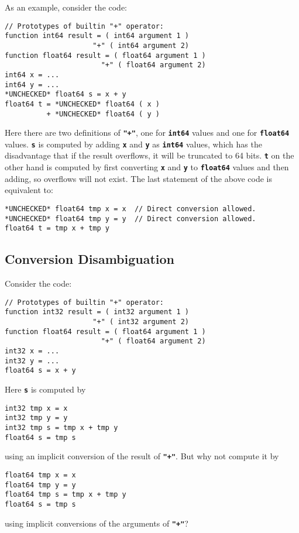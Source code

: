 \documentclass[12pt]{article}
\newcommand{\TT}[1]{{\tt \bfseries #1}}
\newenvironment{indpar}[1][0.3in]%
	{\begin{list}{}%
		     {\setlength{\itemsep}{0in}%
		      \setlength{\topsep}{0in}%
		      \setlength{\parsep}{1ex}%
		      \setlength{\labelwidth}{#1}%
		      \setlength{\leftmargin}{#1}%
		      \addtolength{\leftmargin}{\labelsep}}%
	 \item}%
	{\end{list}}
\begin{document}
As an example, consider the code:
\begin{indpar}\begin{verbatim}
// Prototypes of builtin "+" operator:
function int64 result = ( int64 argument 1 )
                     "+" ( int64 argument 2)
function float64 result = ( float64 argument 1 )
                       "+" ( float64 argument 2)
int64 x = ...
int64 y = ...
*UNCHECKED* float64 s = x + y
float64 t = *UNCHECKED* float64 ( x )
          + *UNCHECKED* float64 ( y )
\end{verbatim}\end{indpar}

Here there are two definitions of \TT{"+"}, one for \TT{int64}
values and one for \TT{float64} values.
\TT{s} is computed by adding \TT{x} and \TT{y} as \TT{int64}
values, which has the disadvantage that if the result overflows,
it will be truncated to 64 bits.  \TT{t} on the other hand is
computed by first converting \TT{x} and \TT{y} to \TT{float64}
values and then adding, so overflows will not exist.  The last
statement of the above code is equivalent to:
\begin{indpar}\begin{verbatim}
*UNCHECKED* float64 tmp x = x  // Direct conversion allowed.
*UNCHECKED* float64 tmp y = y  // Direct conversion allowed.
float64 t = tmp x + tmp y
\end{verbatim}\end{indpar}


\subsection{Conversion Disambiguation}
\label{CONVERSION-DISAMBIGUATION}

Consider the code:
\begin{indpar}\begin{verbatim}
// Prototypes of builtin "+" operator:
function int32 result = ( int32 argument 1 )
                     "+" ( int32 argument 2)
function float64 result = ( float64 argument 1 )
                       "+" ( float64 argument 2)
int32 x = ...
int32 y = ...
float64 s = x + y
\end{verbatim}\end{indpar}

Here \TT{s} is computed by
\begin{indpar}\begin{verbatim}
int32 tmp x = x
int32 tmp y = y
int32 tmp s = tmp x + tmp y
float64 s = tmp s
\end{verbatim}\end{indpar}
using an implicit conversion of the result of \TT{"+"}.
But why not compute it by
\begin{indpar}\begin{verbatim}
float64 tmp x = x
float64 tmp y = y
float64 tmp s = tmp x + tmp y
float64 s = tmp s
\end{verbatim}\end{indpar}
using implicit conversions of the arguments of \TT{"+"}?
\end{document}
